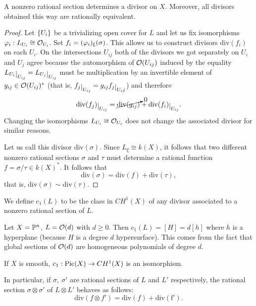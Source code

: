 \begin{proposition}[]
A nonzero rational section determines a divisor on $X$. Moreover, all divisors obtained this way are rationally equivalent.
\end{proposition}
\begin{proof}
Let $\left\{{U_i}\right\}$ be a trivializing open cover for $L$ and let us fix isomorphisms $\varphi_i:L_{U_i}\cong \mathcal{O}_{U_i}$. Set $f_i=(\varphi_i)_\xi(\sigma)$. This allows us to construct divisors $\mathrm{div}(f_i)$ on each $U_i$. On the intersections $U_{ij}$ both of the divisors we got separately on $U_i$ and $U_j$ agree because the automorphism of $\mathcal{O}(U_{ij})$ induced by the equality $L_{U_{i}}\res{U_{ij}}=L_{U_j}\res{U_{ij}}$ must be multiplication by an invertible element of $g_{ij}\in \mathcal{O}(U_{ij})^\ast$ (that is, $f_j\res{U_{ij}}=g_{ij}f_j\res{U_ij}$) and therefore
\[\mathrm{div}(f_j)\res{U_{ij}}=\cancelto{0}{\mathrm{div}(g_{ij})}+\mathrm{div}(f_i)\res{U_{ij}}.\]
Changing the isomorphisms $L_{U_i}\cong \mathcal{O}_{U_i}$ does not change the associated divisor for similar reasons.

Let us call this divisor $\mathrm{div}(\sigma)$.
Since $L_\xi\cong k(X)$, it follows that two different nonzero rational sections $\sigma$ and $\tau$ must determine a rational function $f=\sigma/\tau\in k(X)^\ast$. It follows that
\[\mathrm{div}(\sigma)=\mathrm{div}(f)+\mathrm{div}(\tau),\]
that is, $\mathrm{div}(\sigma)\sim \mathrm{div}(\tau)$.
\end{proof}

\begin{definition}[]
We define $c_1(L)$ to be the class in $CH^1(X)$ of any divisor associated to a nonzero rational section of $L$.
\end{definition}

\begin{example}
Let $X=\mathbb{P}^n$, $L=\mathcal{O}(d)$ with $d\geq 0$. Then $c_1(L)=[H]=d[h]$ where $h$ is a hyperplane (because $H$ is a degree $d$ hypersurface). This comes from the fact that global sections of $\mathcal{O}(d)$ are homogeneous polynomials of degree $d$.
\end{example}

\begin{proposition}[]
If $X$ is smooth, $c_1:\operatorname{Pic}(X)\to CH^1(X)$ is an isomorphism. 

In particular, if $\sigma,\ \sigma'$ are rational sections of $L$ and $L'$ respectively, the rational section $\sigma\otimes \sigma'$ of $L\otimes L'$ behaves as follows: 
\[\mathrm{div}(f\otimes f')=\mathrm{div}(f)+\mathrm{div(f')}.\]
\end{proposition}


